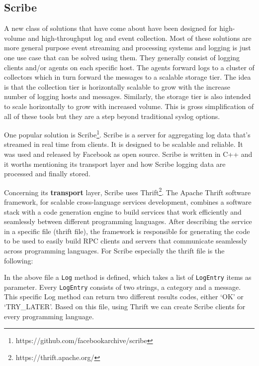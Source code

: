 \subsection{Scribe}
A new class of solutions that have come about have been designed for high-volume
and high-throughput log and event collection. Most of these solutions are more
general purpose event streaming and processing systems and logging is just one
use case that can be solved using them. They generally consist of logging
clients and/or agents on each specific host. The agents forward logs to a
cluster of collectors which in turn forward the messages to a scalable storage
tier. The idea is that the collection tier is horizontally scalable to grow with
the increase number of logging hosts and messages. Similarly, the storage tier
is also intended to scale horizontally to grow with increased volume. This is
gross simplification of all of these tools but they are a step beyond
traditional syslog options.

One popular solution is
Scribe\footnote{https://github.com/facebookarchive/scribe}. Scribe is a server
for aggregating log data that's streamed in real time from clients. It is
designed to be scalable and reliable. It was used and released by Facebook as
open source. Scribe is written in C++ and it worths mentioning its transport
layer and how Scribe logging data are processed and finally stored.

Concerning its \textbf{transport} layer, Scribe uses
Thrift\footnote{https://thrift.apache.org/}. The Apache Thrift software
framework, for scalable cross-language services development, combines a software
stack with a code generation engine to build services that work efficiently and
seamlessly between different programming languages. After describing the service
in a specific file (thrift file), the framework is responsible for generating
the code to be used to easily build RPC clients and servers that communicate
seamlessly across programming languages. For Scribe especially the thrift file
is the following:  


In the above file a \texttt{Log} method is defined, which takes a list of
\texttt{LogEntry} items as parameter. Every \texttt{LogEntry} consists of two
strings, a category and a message. This specific Log method can return two
different results codes, either `OK' or `TRY\_LATER'. Based on this file, using
Thrift we can create Scribe clients for every programming language.

